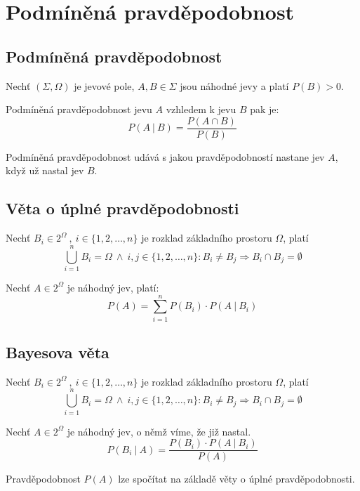 
\section{Podmíněná pravděpodobnost}

\subsection{Podmíněná pravděpodobnost}

\begin{compactitem}
    \item Nechť $(\Sigma, \Omega)$ je jevové pole, $A, B \in \Sigma$ jsou náhodné jevy a platí $P(B) > 0$.

    \item Podmíněná pravděpodobnost jevu $A$ vzhledem k jevu $B$ pak je:
    $$ P(A ~|~ B) = \frac{P(A \cap B)}{P(B)} $$

    \item Podmíněná pravděpodobnost udává s jakou pravděpodobností nastane jev $A$, když už nastal jev $B$.
\end{compactitem}

\subsection{Věta o úplné pravděpodobnosti}

\begin{compactitem}
    \item Nechť $B_i \in 2^{\Omega} ~,~ i \in \{ 1, 2, \ldots, n \}$ je rozklad základního prostoru $\Omega$, platí
    $$ \bigcup_{i=1}^n B_i = \Omega ~\land~ i, j \in \{ 1, 2, \ldots, n \} : B_i \not= B_j \Rightarrow B_i \cap B_j = \emptyset $$

    \item Nechť $A \in 2^{\Omega}$ je náhodný jev, platí:
    $$ P(A) = \sum_{i=1}^n P(B_i) \cdot P(A ~|~ B_i) $$
\end{compactitem}

\subsection{Bayesova věta}

\begin{compactitem}
    \item Nechť $B_i \in 2^{\Omega} ~,~ i \in \{ 1, 2, \ldots, n \}$ je rozklad základního prostoru $\Omega$, platí
    $$ \bigcup_{i=1}^n B_i = \Omega ~\land~ i, j \in \{ 1, 2, \ldots, n \} : B_i \not= B_j \Rightarrow B_i \cap B_j = \emptyset $$

    \item Nechť $A \in 2^{\Omega}$ je náhodný jev, o němž víme, že již nastal.
    $$ P(B_i ~|~ A) = \frac{P(B_i) \cdot P(A ~|~ B_i)}{P(A)}$$

    \item Pravděpodobnost $P(A)$ lze spočítat na základě věty o úplné pravděpodobnosti.
\end{compactitem}

